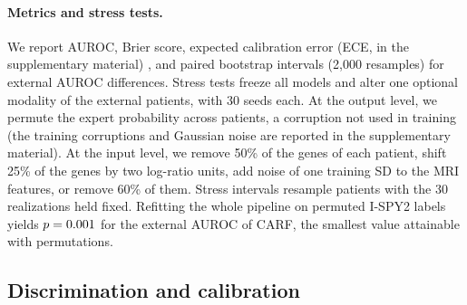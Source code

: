 \documentclass[runningheads]{llncs}
\begin{document}
\paragraph{Metrics and stress tests.} We report AUROC, Brier score, expected calibration error (ECE, in the supplementary material) \cite{guo2017}, and paired bootstrap intervals (2{,}000 resamples) for external AUROC differences. Stress tests freeze all models and alter one optional modality of the external patients, with 30 seeds each. At the output level, we permute the expert probability across patients, a corruption not used in training (the training corruptions and Gaussian noise are reported in the supplementary material). At the input level, we remove 50\% of the genes of each patient, shift 25\% of the genes by two log-ratio units, add noise of one training SD to the MRI features, or remove 60\% of them. Stress intervals resample patients with the 30 realizations held fixed. Refitting the whole pipeline on permuted I-SPY2 labels yields $p=0.001$ for the external AUROC of CARF, the smallest value attainable with \NPerm{} permutations.

\subsection{Discrimination and calibration}

\begin{table}[t]
\centering
\caption{Discrimination, robustness, and displacement. Internal AUROC: mean $\pm$ SD over the 25 outer folds on I-SPY2. External metrics on the \NExt{} I-SPY1 patients (higher AUROC is better). $\Delta$AUROC: CARF minus the model, 95\% paired bootstrap interval (negative values favor the model). RNA perm.: AUROC with the transcriptomic output permuted (mean of 30 realizations). $\max|z-a|$: largest change of the logit from the clinical anchor over all stress scenarios (lower is better). Bold: best among the fusion baselines and CARF; single experts and ablations are shown for reference.}
\label{tab:main}
\end{table}
\end{document}
